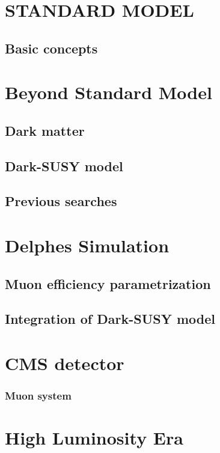 
\chapter{STANDARD MODEL} \label{chap:intro}



\section{Basic concepts}

 




 
\chapter{Beyond Standard Model} 

\section{Dark matter}



\section{Dark-SUSY model}

\section{Previous searches}



\chapter{Delphes Simulation}

\section{Muon efficiency parametrization}

\section{Integration of Dark-SUSY model}


\chapter{CMS detector}

\subsection{Muon system}

\chapter{High Luminosity Era}




